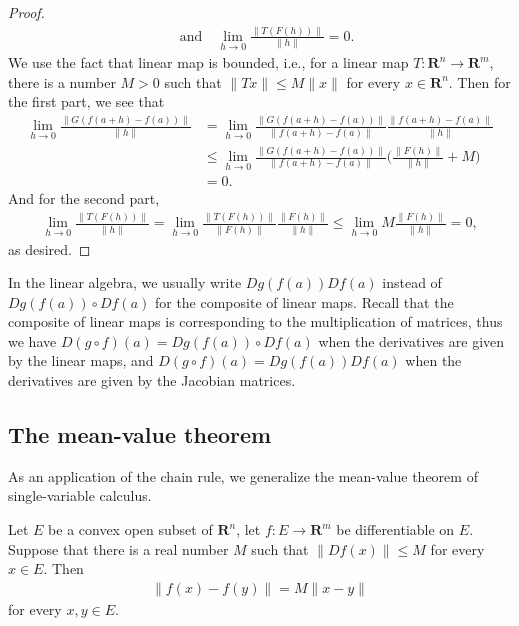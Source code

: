\begin{proof}
\begin{align*}
            \quad\text{and}\quad
            \lim_{h \to 0}\frac{\|T(F(h))\|}{\|h\|} = 0.
        \end{align*}
    We use the fact that linear map is bounded, i.e., for a linear map $T : \mathbf{R}^n \to \mathbf{R}^m$, there is a number $M > 0$ such that $\|Tx\| \leq M\|x\|$ for every $x \in \mathbf{R}^n$. Then for the first part, we see that
        \begin{align*}
            \lim_{h \to 0}\frac{\|G(f(a + h) - f(a))\|}{\|h\|}
            &= \lim_{h \to 0}\frac{\|G(f(a + h) - f(a))\|}{\|f(a + h) - f(a)\|}\frac{\|f(a + h) - f(a)\|}{\|h\|}\\
            &\leq \lim_{h \to 0}\frac{\|G(f(a + h) - f(a))\|}{\|f(a + h) - f(a)\|}\Big(\frac{\|F(h)\|}{\|h\|} + M\Big)\\
            &= 0.
        \end{align*}
    And for the second part,
        \begin{align*}
            \lim_{h \to 0}\frac{\|T(F(h))\|}{\|h\|}
            = \lim_{h \to 0}\frac{\|T(F(h))\|}{\|F(h)\|}\frac{\|F(h)\|}{\|h\|}
            \leq \lim_{h \to 0}M\frac{\|F(h)\|}{\|h\|} = 0,
        \end{align*}
    as desired.
\end{proof}

\begin{remark}
    In the linear algebra, we usually write $Dg(f(a))Df(a)$ instead of $Dg(f(a)) \circ Df(a)$ for the composite of linear maps. Recall that the composite of linear maps is corresponding to the multiplication of matrices, thus we have $D(g \circ f)(a) = Dg(f(a)) \circ Df(a)$ when the derivatives are given by the linear maps, and $D(g \circ f)(a) = Dg(f(a))Df(a)$ when the derivatives are given by the Jacobian matrices.
\end{remark}


\subsection{The mean-value theorem}

As an application of the chain rule, we generalize the mean-value theorem of single-variable calculus.

\begin{theorem}\label{thm:mean-value}
    Let $E$ be a convex open subset of $\mathbf{R}^n$, let $f : E \to \mathbf{R}^m$ be differentiable on $E$. Suppose that there is a real number $M$ such that $\|Df(x)\| \leq M$ for every $x \in E$. Then
    \begin{align*}
        \|f(x) - f(y)\| = M\|x - y\|
    \end{align*}
    for every $x, y \in E$.
\end{theorem}

